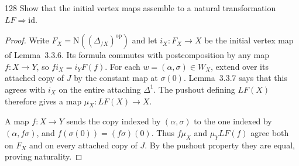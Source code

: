 \begin{exercise}{128}
Show that the initial vertex maps assemble to a natural transformation $LF\Rightarrow\mathrm{id}$.

\begin{proof}
Write $F_X=\mathrm N((\Delta_{/X})^{\mathrm{op}})$ and let
$i_X\colon F_X\to X$ be the initial vertex map of Lemma~3.3.6.
Its formula commutes with postcomposition by any map $f\colon X\to Y$,
so $f i_X=i_YF(f)$.
For each $w=(\alpha,\sigma)\in W_X$, extend over its attached copy of $J$
by the constant map at $\sigma(0)$.
Lemma~3.3.7 says that this agrees with $i_X$ on the entire attaching
$\Delta^1$. The pushout defining $LF(X)$ therefore gives a map
$\mu_X\colon LF(X)\to X$.

A map $f\colon X\to Y$ sends the copy indexed by $(\alpha,\sigma)$ to
the one indexed by $(\alpha,f\sigma)$, and
$f(\sigma(0))=(f\sigma)(0)$.
Thus $f\mu_X$ and $\mu_YLF(f)$ agree both on $F_X$ and on every attached
copy of $J$. By the pushout property they are equal, proving naturality.
\end{proof}
\end{exercise}

